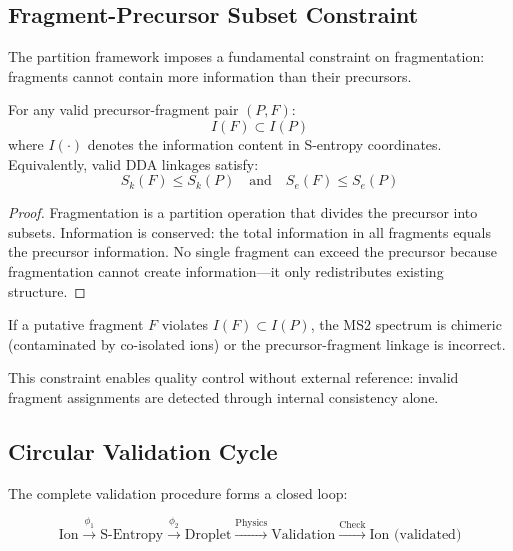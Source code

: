 \subsection{Fragment-Precursor Subset Constraint}

The partition framework imposes a fundamental constraint on fragmentation: fragments cannot contain more information than their precursors.

\begin{theorem}
For any valid precursor-fragment pair $(P, F)$:
\begin{equation}
I(F) \subset I(P)
\end{equation}
where $I(\cdot)$ denotes the information content in S-entropy coordinates. Equivalently, valid DDA linkages satisfy:
\begin{equation}
S_k(F) \leq S_k(P) \quad \text{and} \quad S_e(F) \leq S_e(P)
\end{equation}
\end{theorem}

\begin{proof}
Fragmentation is a partition operation that divides the precursor into subsets. Information is conserved: the total information in all fragments equals the precursor information. No single fragment can exceed the precursor because fragmentation cannot create information---it only redistributes existing structure.
\end{proof}

\begin{corollary}
If a putative fragment $F$ violates $I(F) \subset I(P)$, the MS2 spectrum is chimeric (contaminated by co-isolated ions) or the precursor-fragment linkage is incorrect.
\end{corollary}

This constraint enables quality control without external reference: invalid fragment assignments are detected through internal consistency alone.

\subsection{Circular Validation Cycle}

The complete validation procedure forms a closed loop:

\begin{equation}
\text{Ion} \xrightarrow{\phi_1} \text{S-Entropy} \xrightarrow{\phi_2} \text{Droplet} \xrightarrow{\text{Physics}} \text{Validation} \xrightarrow{\text{Check}} \text{Ion (validated)}
\end{equation}

